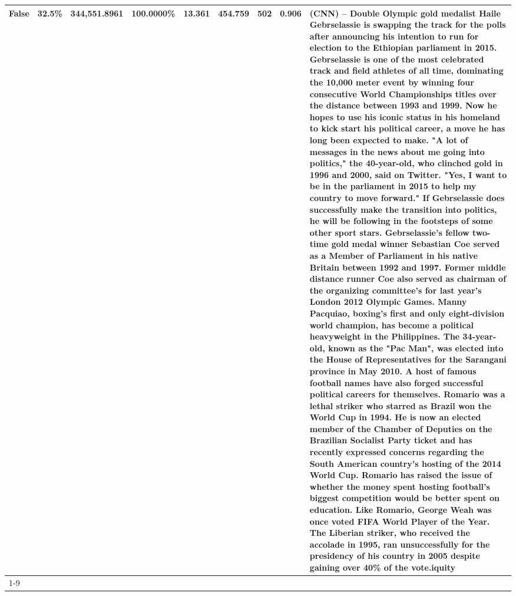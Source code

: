 \begin{table}[H]
{\begin{tabular}{lllrlllll}
False & 32.5\% & 344,551.8961 & \bfseries \color{red} 100.0000\% & 13.361 & 454.759 & 502 & 0.906 & (CNN) -- Double Olympic gold medalist Haile Gebrselassie is swapping the track for the polls after announcing his intention to run for election to the Ethiopian parliament in 2015. Gebrselassie is one of the most celebrated track and field athletes of all time, dominating the 10,000 meter event by winning four consecutive World Championships titles over the distance between 1993 and 1999. Now he hopes to use his iconic status in his homeland to kick start his political career, a move he has long been expected to make. "A lot of messages in the news about me going into politics," the 40-year-old, who clinched gold in 1996 and 2000, said on Twitter. "Yes, I want to be in the parliament in 2015 to help my country to move forward." If Gebrselassie does successfully make the transition into politics, he will be following in the footsteps of some other sport stars. Gebrselassie's fellow two-time gold medal winner Sebastian Coe served as a Member of Parliament in his native Britain between 1992 and 1997. Former middle distance runner Coe also served as chairman of the organizing committee's for last year's London 2012 Olympic Games. Manny Pacquiao, boxing's first and only eight-division world champion, has become a political heavyweight in the Philippines. The 34-year-old, known as the "Pac Man", was elected into the House of Representatives for the Sarangani province in May 2010. A host of famous football names have also forged successful political careers for themselves. Romario was a lethal striker who starred as Brazil won the World Cup in 1994. He is now an elected member of the Chamber of Deputies on the Brazilian Socialist Party ticket and has recently expressed concerns regarding the South American country's hosting of the 2014 World Cup. Romario has raised the issue of whether the money spent hosting football's biggest competition would be better spent on education. Like Romario, George Weah was once voted FIFA World Player of the Year. The Liberian striker, who received the accolade in 1995, ran unsuccessfully for the presidency of his country in 2005 despite gaining over 40\% of the vote.iquity \\
\cline{1-9}

\end{tabular}}
\end{table}
